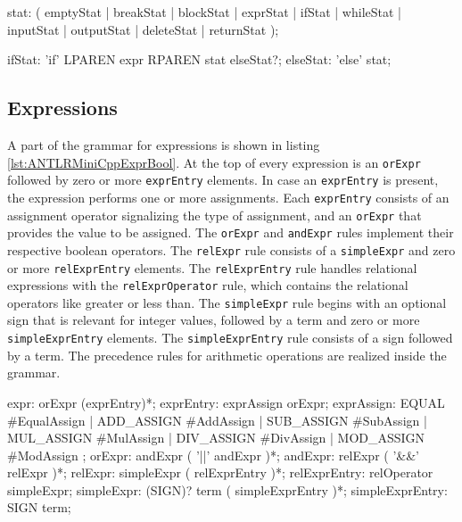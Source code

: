 \begin{AntlrCode}[float,numbers=none,caption=Statement rule and it's production alternatives of the MiniC++ ANTLR grammar., label=lst:ANTLRMiniCppStatAlt]
stat:  ( emptyStat  | breakStat
       | blockStat  | exprStat
       | ifStat     | whileStat
       | inputStat  | outputStat
       | deleteStat | returnStat
       );
\end{AntlrCode}

\begin{AntlrCode}[float,numbers=none,caption=If Statement rule for the MiniC++ ANTLR grammar., label=lst:ANTLRMiniCppStatIf]
ifStat:      'if' LPAREN expr RPAREN stat elseStat?;
elseStat:    'else' stat;
\end{AntlrCode}



\subsection{Expressions}

A part of the grammar for expressions is shown in listing \ref{lst:ANTLRMiniCppExprBool}. At the top of every expression is an \texttt{orExpr} followed by zero or more \texttt{exprEntry} elements. In case an \texttt{exprEntry} is present, the expression performs one or more assignments. Each \texttt{exprEntry} consists of an assignment operator signalizing the type of assignment, and an \texttt{orExpr} that provides the value to be assigned. The \verb|orExpr| and \verb|andExpr| rules implement their respective boolean operators. The \verb|relExpr| rule consists of a \verb|simpleExpr| and zero or more \verb|relExprEntry| elements. The \verb|relExprEntry| rule handles relational expressions with the \verb|relExprOperator| rule, which contains the relational operators like greater or less than. The \verb|simpleExpr| rule begins with an optional sign that is relevant for integer values, followed by a term and zero or more \verb|simpleExprEntry| elements. The \verb|simpleExprEntry| rule consists of a sign followed by a term. The precedence rules for arithmetic operations are realized inside the grammar.



\begin{AntlrCode}[float,numbers=none,caption=Expression rules for assignment and boolean operations of the MiniC++ ANTLR grammar., label=lst:ANTLRMiniCppExprBool]
expr:                 orExpr (exprEntry)*;
exprEntry:            exprAssign orExpr;
exprAssign:           EQUAL      #EqualAssign
                    | ADD_ASSIGN #AddAssign
                    | SUB_ASSIGN #SubAssign
                    | MUL_ASSIGN #MulAssign
                    | DIV_ASSIGN #DivAssign
                    | MOD_ASSIGN #ModAssign
                    ;
orExpr:             andExpr ( '||' andExpr )*;
andExpr:            relExpr ( '&&' relExpr )*;
relExpr:            simpleExpr
                    ( relExprEntry )*;
relExprEntry:       relOperator simpleExpr;
simpleExpr:         (SIGN)?
                    term ( simpleExprEntry )*;
simpleExprEntry:    SIGN term;
\end{AntlrCode}

